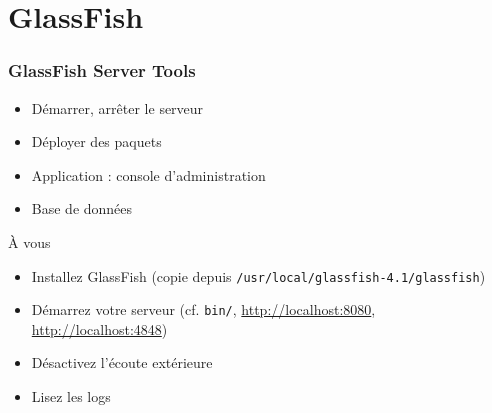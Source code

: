 \documentclass[english, french]{beamer}
\begin{document}
\section{GlassFish}
\begin{frame}
	\frametitle{GlassFish Server Tools}
	\begin{itemize}
		\item Démarrer, arrêter le serveur
		\item Déployer des paquets
		\item Application : console d’administration
		\item Base de données
	\end{itemize}
	\begin{block}{À vous}
		\begin{itemize}
			\item \og{}Installez\fg{} GlassFish (copie depuis \texttt{/usr/local/glassfish-4.1/glassfish})
			\item Démarrez votre serveur (cf. \texttt{bin/}, \url{http://localhost:8080}, \url{http://localhost:4848})
			\item Désactivez l’écoute extérieure
			\item Lisez les logs
		\end{itemize}
	\end{block}
\end{frame}
\end{document}
